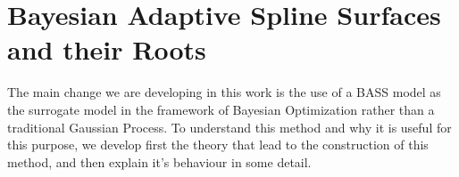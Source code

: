\chapter{Bayesian Adaptive Spline Surfaces and their Roots}

The main change we are developing in this work is the use of a BASS model as the surrogate model in the framework of Bayesian Optimization rather than a traditional Gaussian Process. To understand this method and why it is useful for this purpose, we develop first the theory that lead to the construction of this method, and then explain it's behaviour in some detail. 